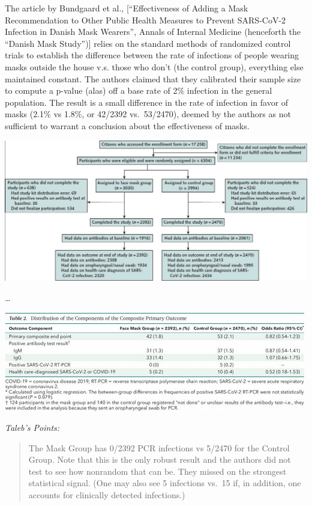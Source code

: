 \documentclass[
]{book}
\begin{document}
The article by Bundgaard et al., {[}``Effectiveness of Adding a Mask Recommendation to Other Public Health Measures to Prevent SARS-CoV-2 Infection in Danish Mask Wearers'', Annals of Internal Medicine (henceforth the ``Danish Mask Study''){]} relies on the standard methods of randomized control trials to establish the difference between the rate of infections of people wearing masks outside the house v.s. those who don't (the control group), everything else maintained constant.
The authors claimed that they calibrated their sample size to compute a p-value (alas) off a base rate of 2\% infection in the general population.
The result is a small difference in the rate of infection in favor of masks (2.1\% vs 1.8\%, or 42/2392 vs.~53/2470), deemed by the authors as not sufficient to warrant a conclusion about the effectiveness of masks.

\includegraphics{fig/Bundgaard_Study_Flow.jpg}

\ldots{}

\includegraphics{fig/Bundgaard_Outcome_Components.jpg}

\emph{Taleb's Points:}

\begin{quote}
The Mask Group has 0/2392 PCR infections vs 5/2470 for the Control Group. Note that this is the only robust result and the authors did not test to see how nonrandom that can be. They missed on the strongest statistical signal. (One may also see 5 infections vs.~15 if, in addition, one accounts for clinically detected infections.)
\end{quote}
\end{document}
